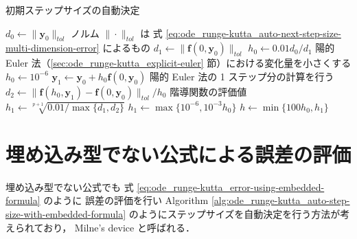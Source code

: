 \begin{algorithm}[tbp]
    \caption{初期ステップサイズの自動決定 \cite[Section II.4]{Hairer1993}}
    \label{alg:ode_runge-kutta_auto-step-size-init}
    \begin{algorithmic}
        \State $d_0 \gets \|\bm{y}_0\|_{tol}$
        \Comment ノルム $\| \cdot \|_{tol}$ は
        式 \eqref{eq:ode_runge-kutta_auto-next-step-size-multi-dimension-error} によるもの
        \State $d_1 \gets \|\bm{f}(0, \bm{y}_0)\|_{tol}$
        \State $h_0 \gets 0.01 d_0 / d_1$
        \Comment 陽的 Euler 法（\ref{sec:ode_runge-kutta_explicit-euler} 節）における変化量を小さくする
        \Else
        \State $h_0 \gets 10^{-6}$
        \EndIf
        \State $\bm{y}_1 \gets \bm{y}_0 + h_0 \bm{f}(0, \bm{y}_0)$
        \Comment 陽的 Euler 法の 1 ステップ分の計算を行う
        \State $d_2 \gets \|\bm{f}(h_0, \bm{y}_1) - \bm{f}(0, \bm{y}_0)\|_{tol} / h_0$
         階導関数の評価値
        \State $h_1 \gets \sqrt[p+1]{0.01 / \max{\{d_1, d_2\}}}$
        \Else
        \State $h_1 \gets \max{\{10^{-6}, 10^{-3} h_0\}}$
        \EndIf
        \State $h \gets \min{\{100 h_0, h_1\}}$
        \EndProcedure
    \end{algorithmic}
\end{algorithm}

\section{埋め込み型でない公式による誤差の評価}

埋め込み型でない公式でも
式 \eqref{eq:ode_runge-kutta_error-using-embedded-formula} のように
誤差の評価を行い
Algorithm \ref{alg:ode_runge-kutta_auto-step-size-with-embedded-formula}
のようにステップサイズを自動決定を行う方法が考えられており，
Milne's device \cite[4.1 節 (b)]{Mitsui1993} と呼ばれる．

